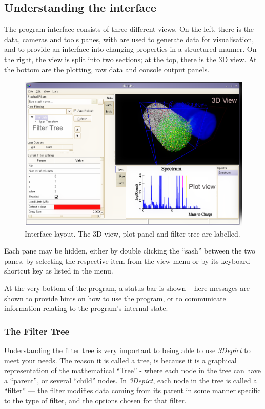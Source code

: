 \documentclass[10pt]{article}
\begin{document}
\subsection{Understanding the interface}
The program interface consists of three different views. On the left, there is the data, cameras and tools panes, with are used to generate data for visualisation, and to provide an interface into changing properties in a structured manner. On the right, the view is split into two sections; at the top, there is the 3D view. At the bottom are the plotting, raw data and console output panels.  

\begin{figure}[ht]
  \centering
 \includegraphics[width=0.85 \textwidth,keepaspectratio=true]{./figures/interface.png}

 \caption{Interface layout. The 3D view, plot panel and filter tree are labelled.}
\label{fig:interfaceLayout}
\end{figure}


Each pane may be hidden, either by double clicking the ``sash'' between the two panes, by selecting the respective item from the view menu or by its keyboard shortcut key as listed in the menu.  

At the very bottom of the program, a status bar is shown -- here messages are shown to provide hints on how to use the program, or to communicate information relating to the program's internal state. 

\subsubsection{The Filter Tree}
Understanding the filter tree is very important to being able to use \emph{3Depict} to meet your needs. The reason it is called a tree, is because it is a graphical representation of the mathematical ``Tree'' - where each node in the tree can have a ``parent'', or several ``child'' nodes.  In \emph{3Depict}, each node in the tree is called a ``filter'' --- the filter modifies data coming from its parent in some manner specific to the type of filter, and the options chosen for that filter.
\end{document}
